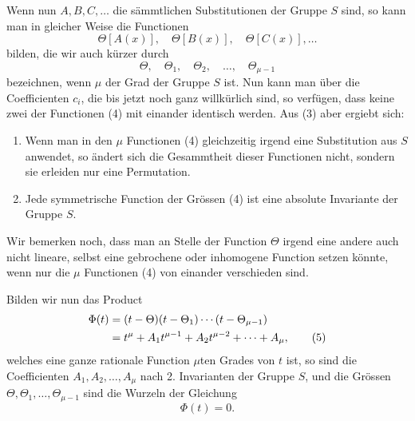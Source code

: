\documentclass[11pt]{article}
\begin{document}
Wenn nun $A,B,C,\ldots$ die sämmtlichen Substitutionen der Gruppe $S$ sind, so kann man in gleicher Weise die Functionen
\begin{equation}
\Theta[A(x)],\quad\Theta[B(x)],\quad\Theta[C(x)],\ldots
\tag{3}
\end{equation}
bilden, die wir auch kürzer durch
\begin{equation}
\Theta,\quad \Theta_1,\quad \Theta_2,\quad\ldots,\quad\Theta_{\mu-1}
\tag{4}
\end{equation}
bezeichnen, wenn $\mu$ der Grad der Gruppe $S$ ist. Nun kann man über die Coefficienten $c_i$, die bis jetzt noch ganz willkürlich sind, so verfügen, dass keine zwei der Functionen (4) mit einander identisch werden. Aus (3) aber ergiebt sich:
\begin{enumerate}[label=\arabic*.,leftmargin=2.2em]
\item Wenn man in den $\mu$ Functionen (4) gleichzeitig irgend eine Substitution aus $S$ anwendet, so ändert sich die Gesammtheit dieser Functionen nicht, sondern sie erleiden nur eine Permutation.
\item Jede symmetrische Function der Grössen (4) ist eine absolute Invariante der Gruppe $S$.
\end{enumerate}
Wir bemerken noch, dass man an Stelle der Function $\Theta$ irgend eine andere auch nicht lineare, selbst eine gebrochene oder inhomogene Function setzen könnte, wenn nur die $\mu$ Functionen (4) von einander verschieden sind.

Bilden wir nun das Product
\begin{align}
\Phi(t)&=(t-\Theta)(t-\Theta_1)\cdots(t-\Theta_{\mu-1})\notag\\
&=t^\mu+A_1t^{\mu-1}+A_2t^{\mu-2}+\cdots+A_\mu,
\tag{5}
\end{align}
welches eine ganze rationale Function $\mu$ten Grades von $t$ ist, so sind die Coefficienten $A_1,A_2,\ldots,A_\mu$ nach 2. Invarianten der Gruppe $S$, und die Grössen $\Theta,\Theta_1,\ldots,\Theta_{\mu-1}$ sind die Wurzeln der Gleichung
\begin{equation}
\Phi(t)=0.
\tag{6}
\end{equation}
\end{document}
